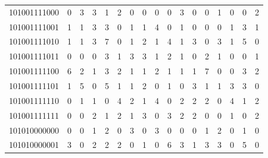 \documentclass[10pt,a4paper]{article}
\begin{document}
\begin{longtable}{ |c|c|c|c|c|c|c|c|c|c|c|c|c|c|c|c|c| }
    101001111000              & 0                            & 3                                & 3                            & 1                              & 2   & 0   & 0   & 0   & 0   & 3   & 0   & 0   & 1   & 0   & 0   & 2   \\
    101001111001              & 1                            & 1                                & 3                            & 3                              & 0   & 1   & 1   & 4   & 0   & 1   & 0   & 0   & 0   & 1   & 3   & 1   \\
    101001111010              & 1                            & 1                                & 3                            & 7                              & 0   & 1   & 2   & 1   & 4   & 1   & 3   & 0   & 3   & 1   & 5   & 0   \\
    101001111011              & 0                            & 0                                & 0                            & 3                              & 1   & 3   & 3   & 1   & 2   & 1   & 0   & 2   & 1   & 0   & 0   & 1   \\
    101001111100              & 6                            & 2                                & 1                            & 3                              & 2   & 1   & 1   & 2   & 1   & 1   & 1   & 7   & 0   & 0   & 3   & 2   \\
    101001111101              & 1                            & 5                                & 0                            & 5                              & 1   & 1   & 2   & 0   & 1   & 0   & 3   & 1   & 1   & 3   & 3   & 0   \\
    101001111110              & 0                            & 1                                & 1                            & 0                              & 4   & 2   & 1   & 4   & 0   & 2   & 2   & 2   & 0   & 4   & 1   & 2   \\
    101001111111              & 0                            & 0                                & 2                            & 1                              & 2   & 1   & 3   & 0   & 3   & 2   & 2   & 0   & 0   & 1   & 0   & 2   \\
    101010000000              & 0                            & 0                                & 1                            & 2                              & 0   & 3   & 0   & 3   & 0   & 0   & 0   & 1   & 2   & 0   & 1   & 0   \\
    101010000001              & 3                            & 0                                & 2                            & 2                              & 2   & 0   & 1   & 0   & 6   & 3   & 1   & 3   & 3   & 0   & 5   & 0   \\

\end{longtable}
\end{document}
